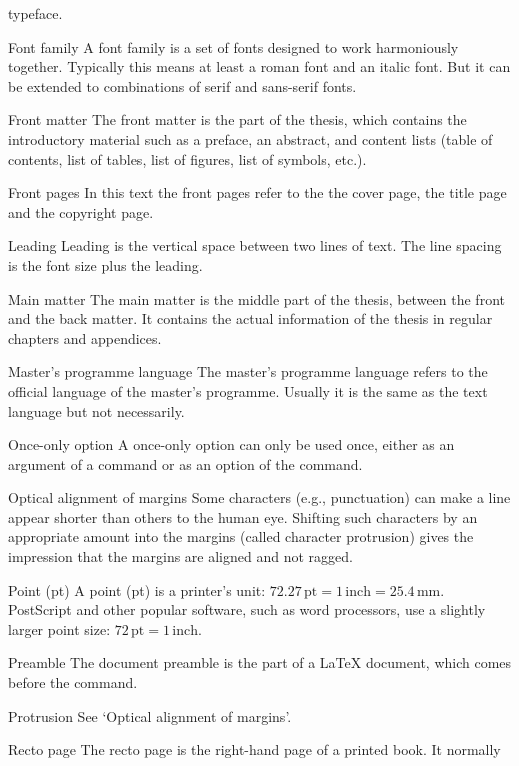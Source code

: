 \begin{termlist}
  typeface.
\item[Font family]
  A font family is a set of fonts designed to work harmoniously together.
  Typically this means at least a roman font and an italic font. But it can
  be extended to combinations of serif and sans-serif fonts.
\item[Front matter]
  The front matter is the part of the thesis, which contains the
  introductory material such as a preface, an abstract, and content lists
  (table of contents, list of tables, list of figures, list of symbols, etc.).
\item[Front pages]
  In this text the front pages refer to the the cover page, the title page
  and the copyright page.
\item[Leading]
  Leading is the vertical space between two lines of text. The line spacing
  is the font size plus the leading.
\item[Main matter]
  The main matter is the middle part of the thesis, between the front and
  the back matter. It contains the actual information of the thesis in
  regular chapters and appendices.
\item[Master's programme language]
  The master's programme language refers to the official language of the
  master's programme. Usually it is the same as the text language but not
  necessarily.
\item[Once-only option \latex]
  A once-only option can only be used once, either as an argument of a
   command or as an option of the  command.
\item[Optical alignment of margins]
  Some characters (e.g., punctuation) can make a line appear shorter than
  others to the human eye. Shifting such characters by an appropriate
  amount into the margins (called character protrusion) gives the impression
  that the margins are aligned and not ragged.
\item[Point (pt)]
  A point (pt) is a printer's unit: $72.27\,\mathrm{pt} = 1\,\mathrm{inch} =
  25.4\,\mathrm{mm}$. PostScript and other popular software, such as word
  processors, use a slightly larger point size: $72\,\mathrm{pt} =
  1\,\mathrm{inch}$.
\item[Preamble \latex]
  The document preamble is the part of a LaTeX document, which comes before
  the \verb"" command.
\item[Protrusion]
  See `Optical alignment of margins'.
\item[Recto page]
  The recto page is the right-hand page of a printed book. It normally

\end{termlist}
